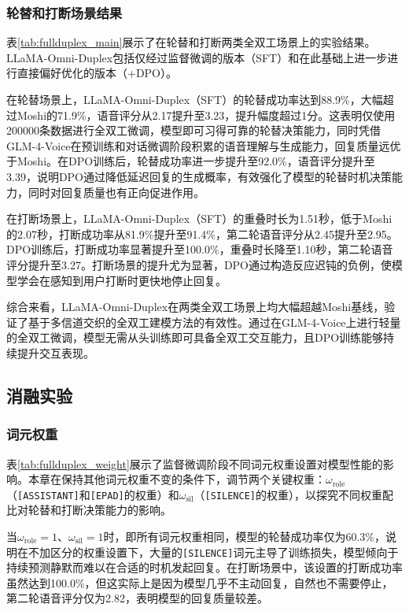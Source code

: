 \subsubsection{轮替和打断场景结果}



表\ref{tab:fullduplex_main}展示了在轮替和打断两类全双工场景上的实验结果。LLaMA-Omni-Duplex包括仅经过监督微调的版本（SFT）和在此基础上进一步进行直接偏好优化的版本（+DPO）。

在轮替场景上，LLaMA-Omni-Duplex（SFT）的轮替成功率达到88.9\%，大幅超过Moshi的71.9\%，语音评分从2.17提升至3.23，提升幅度超过1分。这表明仅使用200000条数据进行全双工微调，模型即可习得可靠的轮替决策能力，同时凭借GLM-4-Voice在预训练和对话微调阶段积累的语音理解与生成能力，回复质量远优于Moshi。在DPO训练后，轮替成功率进一步提升至92.0\%，语音评分提升至3.39，说明DPO通过降低延迟回复的生成概率，有效强化了模型的轮替时机决策能力，同时对回复质量也有正向促进作用。

在打断场景上，LLaMA-Omni-Duplex（SFT）的重叠时长为1.51秒，低于Moshi的2.07秒，打断成功率从81.9\%提升至91.4\%，第二轮语音评分从2.45提升至2.95。DPO训练后，打断成功率显著提升至100.0\%，重叠时长降至1.10秒，第二轮语音评分提升至3.27。打断场景的提升尤为显著，DPO通过构造反应迟钝的负例，使模型学会在感知到用户打断时更快地停止回复。

综合来看，LLaMA-Omni-Duplex在两类全双工场景上均大幅超越Moshi基线，验证了基于多信道交织的全双工建模方法的有效性。通过在GLM-4-Voice上进行轻量的全双工微调，模型无需从头训练即可具备全双工交互能力，且DPO训练能够持续提升交互表现。

\subsection{消融实验}

\subsubsection{词元权重}



表\ref{tab:fullduplex_weight}展示了监督微调阶段不同词元权重设置对模型性能的影响。本章在保持其他词元权重不变的条件下，调节两个关键权重：$\omega_{\text{role}}$（\texttt{[ASSISTANT]}和\texttt{[EPAD]}的权重）和$\omega_{\text{sil}}$（\texttt{[SILENCE]}的权重），以探究不同权重配比对轮替和打断决策能力的影响。

当$\omega_{\text{role}} = 1$、$\omega_{\text{sil}} = 1$时，即所有词元权重相同，模型的轮替成功率仅为60.3\%，说明在不加区分的权重设置下，大量的\texttt{[SILENCE]}词元主导了训练损失，模型倾向于持续预测静默而难以在合适的时机发起回复。在打断场景中，该设置的打断成功率虽然达到100.0\%，但这实际上是因为模型几乎不主动回复，自然也不需要停止，第二轮语音评分仅为2.82，表明模型的回复质量较差。

